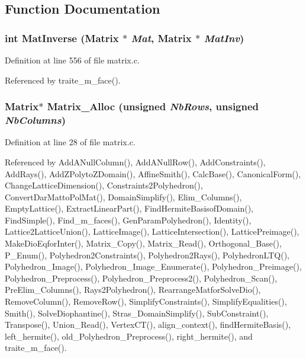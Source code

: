 \subsection{Function Documentation}
\subsubsection{\setlength{\rightskip}{0pt plus 5cm}int Mat\-Inverse (Matrix $\ast$ {\em Mat}, Matrix $\ast$ {\em Mat\-Inv})}\label{matrix_8c_a8}




Definition at line 556 of file matrix.c.

Referenced by traite\_\-m\_\-face().

\subsubsection{\setlength{\rightskip}{0pt plus 5cm}Matrix$\ast$ Matrix\_\-Alloc (unsigned {\em Nb\-Rows}, unsigned {\em Nb\-Columns})}\label{matrix_8c_a0}




Definition at line 28 of file matrix.c.

Referenced by Add\-ANull\-Column(), Add\-ANull\-Row(), Add\-Constraints(), Add\-Rays(), Add\-ZPolyto\-ZDomain(), Affine\-Smith(), Calc\-Base(), Canonical\-Form(), Change\-Lattice\-Dimension(), Constraints2Polyhedron(), Convert\-Dar\-Matto\-Pol\-Mat(), Domain\-Simplify(), Elim\_\-Columns(), Empty\-Lattice(), Extract\-Linear\-Part(), Find\-Hermite\-Basisof\-Domain(), Find\-Simple(), Find\_\-m\_\-faces(), Gen\-Param\-Polyhedron(), Identity(), Lattice2Lattice\-Union(), Lattice\-Image(), Lattice\-Intersection(), Lattice\-Preimage(), Make\-Dio\-Eqfor\-Inter(), Matrix\_\-Copy(), Matrix\_\-Read(), Orthogonal\_\-Base(), P\_\-Enum(), Polyhedron2Constraints(), Polyhedron2Rays(), Polyhedron\-LTQ(), Polyhedron\_\-Image(), Polyhedron\_\-Image\_\-Enumerate(), Polyhedron\_\-Preimage(), Polyhedron\_\-Preprocess(), Polyhedron\_\-Preprocess2(), Polyhedron\_\-Scan(), Pre\-Elim\_\-Columns(), Rays2Polyhedron(), Rearrange\-Matfor\-Solve\-Dio(), Remove\-Column(), Remove\-Row(), Simplify\-Constraints(), Simplify\-Equalities(), Smith(), Solve\-Diophantine(), Stras\_\-Domain\-Simplify(), Sub\-Constraint(), Transpose(), Union\_\-Read(), Vertex\-CT(), align\_\-context(), find\-Hermite\-Basis(), left\_\-hermite(), old\_\-Polyhedron\_\-Preprocess(), right\_\-hermite(), and traite\_\-m\_\-face().

